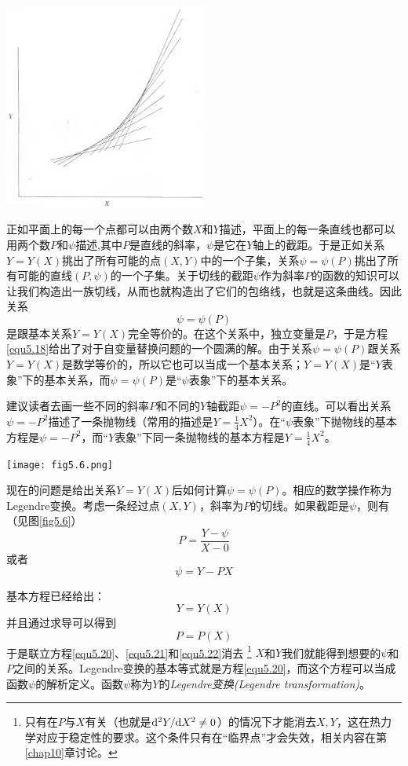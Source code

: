 {
	\centering
	\includegraphics[width=0.5\textwidth]{Pictures/fig5.5.png}
	\figcaption{}
	\label{fig5.5}
}

正如平面上的每一个点都可以由两个数$X$和$Y$描述，平面上的每一条直线也都可以用两个数$P$和$\psi$描述,其中$P$是直线的斜率，$\psi$是它在$Y$轴上的截距。于是正如关系$Y=Y(X)$挑出了所有可能的点$(X,Y)$中的一个子集，关系$\psi=\psi(P)$挑出了所有可能的直线$(P,\psi)$的一个子集。关于切线的截距$\psi$作为斜率$P$的函数的知识可以让我们构造出一族切线，从而也就构造出了它们的包络线，也就是这条曲线。因此关系
\begin{equation}
\label{equ5.18}
	\psi=\psi(P)
\end{equation}
是跟基本关系$Y=Y(X)$完全等价的。在这个关系中，独立变量是$P$，于是方程\eqref{equ5.18}给出了对于自变量替换问题的一个圆满的解。由于关系$\psi=\psi(P)$跟关系$Y=Y(X)$是数学等价的，所以它也可以当成一个基本关系；$Y=Y(X)$是“$Y$表象”下的基本关系，而$\psi=\psi(P)$是“$\psi$表象”下的基本关系。

建议读者去画一些不同的斜率$P$和不同的$Y$轴截距$\psi=-P^2$的直线。可以看出关系$\psi=-P^2$描述了一条抛物线（常用的描述是$Y=\frac{1}{4}X^2$）。在“$\psi$表象”下抛物线的基本方程是$\psi=-P^2$，而“$Y$表象”下同一条抛物线的基本方程是$Y=\frac{1}{4}X^2$。

{
	\centering
	\texttt{[image: fig5.6.png]}
	\figcaption{}
	\label{fig5.6}
}

现在的问题是给出关系$Y=Y(X)$后如何计算$\psi=\psi(P)$。相应的数学操作称为Legendre变换。考虑一条经过点$(X,Y)$，斜率为$P$的切线。如果截距是$\psi$，则有（见图\ref{fig5.6}）
\begin{equation}
\label{equ5.19}
	P=\frac{Y-\psi}{X-0}
\end{equation}
或者
\begin{equation}
\label{equ5.20}
	\psi=Y-PX
\end{equation}

基本方程已经给出：
\begin{equation}
\label{equ5.21}
	Y=Y(X)
\end{equation}
并且通过求导可以得到
\begin{equation}
\label{equ5.22}
	P=P(X)
\end{equation}
于是联立方程\eqref{equ5.20}、\eqref{equ5.21}和\eqref{equ5.22}消去%
\footnote{只有在$P$与$X$有关（也就是$\mathrm{d}^2 Y / \mathrm{d} X^2 \neq 0$）的情况下才能消去$X, Y$，这在热力学对应于稳定性的要求。这个条件只有在“临界点”才会失效，相关内容在第\ref{chap10}章讨论。}%
$X$和$Y$我们就能得到想要的$\psi$和$P$之间的关系。Legendre变换的基本等式就是方程\eqref{equ5.20}，而这个方程可以当成函数$\psi$的解析定义。函数$\psi$称为$Y$的{\it Legendre变换(Legendre transformation)}。

